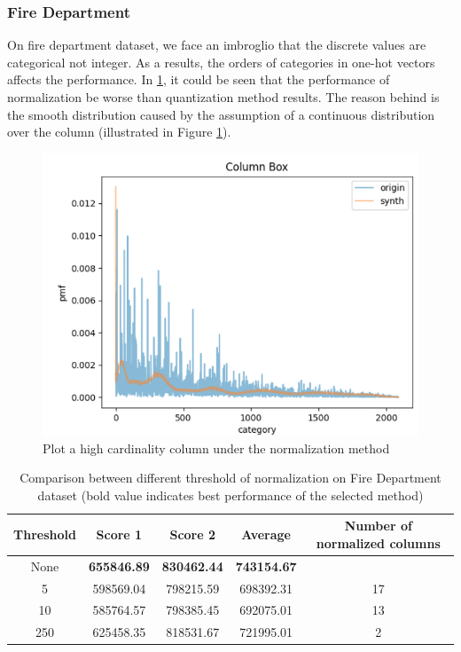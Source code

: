 \documentclass{article}
\begin{document}
\subsubsection{Fire Department}

On fire department dataset, we face an imbroglio that the discrete values are categorical not integer. As a results, the orders of categories in one-hot vectors affects the performance. In \ref{tab:normfire}, it could be seen that the performance of normalization be worse than quantization method results. The reason behind is the smooth distribution caused by the assumption of a continuous distribution over the column (illustrated in Figure \ref{fig:normbox}). 


\begin{figure}[h]
	\centering
	\includegraphics[scale=0.5]{figures/normbox.png}
	\caption{Plot a high cardinality column under the normalization method}
	\label{fig:normbox}
\end{figure}



\begin{table}[]\centering
\begin{tabular}{ccccc}
	\hline
	\textbf{Threshold} & \textbf{Score 1}   & \textbf{Score 2}   & \textbf{Average}   & \textbf{Number of normalized columns} \\ \hline
	None               & \textbf{655846.89} & \textbf{830462.44} & \textbf{743154.67} &                                       \\ \hline
	5                  & 598569.04          & 798215.59          & 698392.31          & 17                                    \\ \hline
	10                 & 585764.57          & 798385.45          & 692075.01          & 13                                    \\ \hline
	250                & 625458.35          & 818531.67          & 721995.01          & 2                                     \\ \hline
\end{tabular}
\caption{Comparison between different threshold of normalization on Fire Department dataset (bold value indicates best performance of the selected method)}
\label{tab:normfire}
\end{table}
\end{document}

